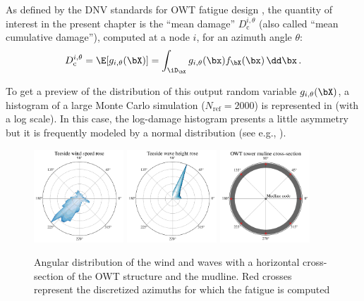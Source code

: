 As defined by the DNV standards for OWT fatigue design \citep{dnv_fatigue_2016}, the quantity of interest in the present chapter is the ``mean damage'' $D_{\mathrm{c}}^{i, \theta}$ (also called ``mean cumulative damage''), computed at a node $i$, for an azimuth angle $\theta$:
\begin{equation}
    D_{\mathrm{c}}^{i, \theta} = \E[g_{i, \theta}(\bX)] = \int_{\iD_\bX} g_{i, \theta}(\bx) f_{\bX}(\bx)\, \dd \bx \,.
    \label{eq:mean_integral}
\end{equation}

To get a preview of the distribution of this output random variable $g_{i, \theta}(\bX)$, a histogram of a large Monte Carlo simulation ($N_{\mathrm{ref}}=2000$) is represented in  (with a log scale). 
In this case, the log-damage histogram presents a little asymmetry but it is frequently modeled by a normal distribution (see e.g., \citealp{teixeira_2019}). 

\begin{figure}[!h]
\begin{center}
    \includegraphics[width=0.3\textwidth]{part2/figures/DCE/teesside/teeside_wind_rose.pdf} \quad
    \includegraphics[width=0.3\textwidth]{part2/figures/DCE/teesside/teeside_wave_rose.pdf} \quad
    \includegraphics[width=0.3\textwidth]{part2/figures/DCE/teesside/mudline_crossection.pdf}
\end{center}
\caption{Angular distribution of the wind and waves with a horizontal cross-section of the OWT structure and the mudline. 
Red crosses represent the discretized azimuths for which the fatigue is computed}
\label{fig:wind_wave_roses}
\end{figure}

